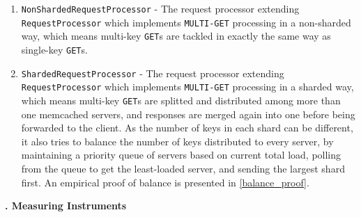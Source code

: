 \begin{enumerate}[noitemsep,topsep=0pt]
\item \texttt{NonShardedRequestProcessor} - The request processor extending \texttt{RequestProcessor} which implements \texttt{MULTI-GET} processing in a non-sharded way, which means multi-key \texttt{GET}s are tackled in exactly the same way as single-key \texttt{GET}s.

\item \texttt{ShardedRequestProcessor} \label{ShardedRequestProcessor} - The request processor extending \texttt{RequestProcessor} which implements \texttt{MULTI-GET} processing in a sharded way, which means multi-key \texttt{GET}s are splitted and distributed among more than one memcached servers, and responses are merged again into one before being forwarded to the client.  As the number of keys in each shard can be different, it also tries to balance the number of keys distributed to every server, by maintaining a priority queue of servers based on current total load, polling from the queue to get the least-loaded server, and sending the largest shard first. An empirical proof of balance is presented in \ref{balance_proof}.
\end{enumerate}

\noindent\textbf{\uppercase\expandafter{}. Measuring Instruments}

